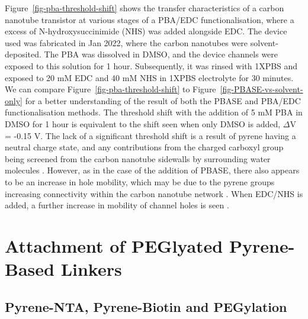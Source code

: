 \documentclass[
  a4paper,
]{scrbook}
\begin{document}
Figure~\ref{fig-pba-threshold-shift} shows the transfer characteristics
of a carbon nanotube transistor at various stages of a PBA/EDC
functionalisation, where a excess of N-hydroxysuccinimide (NHS) was
added alongside EDC. The device used was fabricated in Jan 2022, where
the carbon nanotubes were solvent-deposited. The PBA was dissolved in
DMSO, and the device channels were exposed to this solution for 1 hour.
Subsequently, it was rinsed with 1XPBS and exposed to 20 mM EDC and 40
mM NHS in 1XPBS electrolyte for 30 minutes. We can compare
Figure~\ref{fig-pba-threshold-shift} to
Figure~\ref{fig-PBASE-vs-solvent-only} for a better understanding of the
result of both the PBASE and PBA/EDC functionalisation methods. The
threshold shift with the addition of 5 mM PBA in DMSO for 1 hour is
equivalent to the shift seen when only DMSO is added, \(\Delta\)V =
-0.15 V. The lack of a significant threshold shift is a result of pyrene
having a neutral charge state, and any contributions from the charged
carboxyl group being screened from the carbon nanotube sidewalls by
surrounding water molecules \autocite{Lerner2012}. However, as in the
case of the addition of PBASE, there also appears to be an increase in
hole mobility, which may be due to the pyrene groups increasing
connectivity within the carbon nanotube network
\autocite{Murugathas2019b}. When EDC/NHS is added, a further increase in
mobility of channel holes is seen \autocite{Heller2008}.

\hypertarget{attachment-of-peglyated-pyrene-based-linkers}{%
\section{Attachment of PEGlyated Pyrene-Based
Linkers}\label{attachment-of-peglyated-pyrene-based-linkers}}

\hypertarget{sec-NTA-biotin-PEG}{%
\subsection{Pyrene-NTA, Pyrene-Biotin and
PEGylation}\label{sec-NTA-biotin-PEG}}
\end{document}
